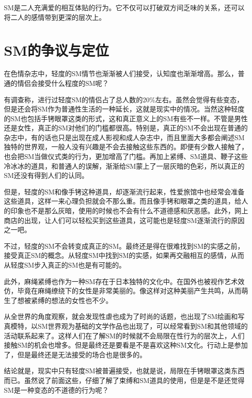 \documentclass[12pt,UTF8]{ctexbook}
\begin{document}
\begin{tcolorbox}[colback=pink!5!white,colframe=red!50!black,title=贴心小叮咛]
SM是二人充满爱的相互体贴的行为。它不仅可以打破双方间乏味的关系，还可以将二人的感情带到更深的层次上。
\end{tcolorbox}

\section{SM的争议与定位}

在色情杂志中，轻度的SM情节也渐渐被人们接受，认知度也渐渐增高。那么，普通的情侣会接受什么程度的SM呢？

有调查称，进行过轻度SM的情侣占了总人数的20\%左右。虽然会觉得有些变态，但是还会将SM作为普通性生活的一种延长，这就是现实中的情况。当然这种轻度的SM也包括手铐眼罩这类的形式，这和真正意义上的SM有些不一样。不管是男性还是女性，真正的SM对他们的门槛都很高。特别是，真正的SM不会出现在普通的杂志中，有的话也只是出现在成人影视和成人杂志中，而且里面大多都会阐述SM独特的世界观，一般人没有兴趣是不会去接触这些东西的。即便有少数人接触了，也会把SM当做仪式类的行为，更加增高了门槛。再加上紧缚、SM道具、鞭子这些冷冰冰的道具，和普通人的误解，渐渐给SM蒙上了一层灰暗的色彩，所以真正的SM还没有得到人们的认同。

但是，轻度的SM和像手铐这种道具，却逐渐流行起来，性爱旅馆中也经常会准备这些道具，这样一来心理负担就会不那么重。而且像手铐和眼罩之类的道具，给人的印象也不是那么灰暗，使用的时候也不会有什么不道德感和厌恶感。此外，网上商店的出现，让人们可以轻松买到这些道具，这可能也是轻度SM逐渐流行的原因之一吧。

不过，轻度的SM不会转变成真正的SM。最终还是得在很难找到SM的实感之前，接受真正SM的概念。从轻度SM中找到SM的实感，如果再交融相互的感情，从而从轻度SM步入真正的SM也是有可能的。

此外，麻绳紧缚也作为一种SM存在于日本独特的文化中。在国外也被视作艺术效仿，毕竟在麻绳缭绕下的女性是非常美丽的。像这样对这种美丽产生共鸣，从而萌生了想被紧缚的想法的女性也不少。

从全世界的角度观察，就会发现性虐也成为了时尚的话题，也出现了SM绘画和写真模特，以SM世界观为基础的文学作品也出现了，可以经常看到SM和其他领域的活动联系起来了。这样人们在了解SM的时候就不会局限在性行为的层次上，人们接触SM的机会也增多。但是最终还是要看是不是喜欢这种SM文化。行动上是参加了，但是最终还是无法接受的场合也是很多的。

结论就是，现实中只有轻度SM被普遍接受，也就是说，局限在手铐眼罩这类东西而已。虽然说了前面这些，仔细了解了束缚和SM道具的使用，但是是不是还觉得SM是一种变态的不道德的行为呢？
\end{document}
